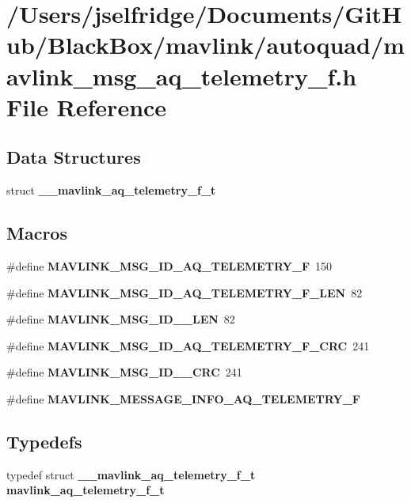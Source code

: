 \section{/\+Users/jselfridge/\+Documents/\+Git\+Hub/\+Black\+Box/mavlink/autoquad/mavlink\+\_\+msg\+\_\+aq\+\_\+telemetry\+\_\+f.h File Reference}
\label{mavlink__msg__aq__telemetry__f_8h}
\subsection*{Data Structures}
\begin{DoxyCompactItemize}
\item 
struct \textbf{ \+\_\+\+\_\+mavlink\+\_\+aq\+\_\+telemetry\+\_\+f\+\_\+t}
\end{DoxyCompactItemize}
\subsection*{Macros}
\begin{DoxyCompactItemize}
\item 
\#define \textbf{ M\+A\+V\+L\+I\+N\+K\+\_\+\+M\+S\+G\+\_\+\+I\+D\+\_\+\+A\+Q\+\_\+\+T\+E\+L\+E\+M\+E\+T\+R\+Y\+\_\+F}~150
\item 
\#define \textbf{ M\+A\+V\+L\+I\+N\+K\+\_\+\+M\+S\+G\+\_\+\+I\+D\+\_\+\+A\+Q\+\_\+\+T\+E\+L\+E\+M\+E\+T\+R\+Y\+\_\+\+F\+\_\+\+L\+EN}~82
\item 
\#define \textbf{ M\+A\+V\+L\+I\+N\+K\+\_\+\+M\+S\+G\+\_\+\+I\+D\+\_\+\_\+\+L\+EN}~82
\item 
\#define \textbf{ M\+A\+V\+L\+I\+N\+K\+\_\+\+M\+S\+G\+\_\+\+I\+D\+\_\+\+A\+Q\+\_\+\+T\+E\+L\+E\+M\+E\+T\+R\+Y\+\_\+\+F\+\_\+\+C\+RC}~241
\item 
\#define \textbf{ M\+A\+V\+L\+I\+N\+K\+\_\+\+M\+S\+G\+\_\+\+I\+D\+\_\+\_\+\+C\+RC}~241
\item 
\#define \textbf{ M\+A\+V\+L\+I\+N\+K\+\_\+\+M\+E\+S\+S\+A\+G\+E\+\_\+\+I\+N\+F\+O\+\_\+\+A\+Q\+\_\+\+T\+E\+L\+E\+M\+E\+T\+R\+Y\+\_\+F}
\end{DoxyCompactItemize}
\subsection*{Typedefs}
\begin{DoxyCompactItemize}
\item 
typedef struct \textbf{ \+\_\+\+\_\+mavlink\+\_\+aq\+\_\+telemetry\+\_\+f\+\_\+t} \textbf{ mavlink\+\_\+aq\+\_\+telemetry\+\_\+f\+\_\+t}
\end{DoxyCompactItemize}


